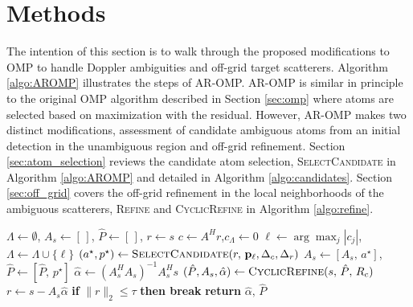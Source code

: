 
\section{Methods}
\label{sec:methods}

The intention of this section is to walk through the proposed modifications to OMP to handle Doppler ambiguities and off-grid target scatterers. Algorithm \ref{algo:AROMP} illustrates the steps of AR-OMP. AR-OMP is similar in principle to the original OMP algorithm described in Section \ref{sec:omp} where atoms are selected based on maximization with the residual. However, AR-OMP makes two distinct modifications, assessment of candidate ambiguous atoms from an initial detection in the unambiguous region and off-grid refinement. Section \ref{sec:atom_selection} reviews the candidate atom selection, \textsc{SelectCandidate} in Algorithm \ref{algo:AROMP} and detailed in Algorithm \ref{algo:candidates}. Section \ref{sec:off_grid} covers the off-grid refinement in the local neighborhoods of the ambiguous scatterers, \textsc{Refine} and \textsc{CyclicRefine} in Algorithm \ref{algo:refine}.

\begin{algorithm}[ht]
\caption{Doppler Ambiguity Refined Orthogonal Matching Pursuit (DAR-OMP)}\label{algo:AROMP}
\begin{algorithmic}[1]
\State $\Lambda \gets \emptyset$,\; $A_s \gets [\,]$,\; $\hat{P} \gets [\,]$,\; $r \gets s$
  \State $c \gets A^{H}r$,\quad $c_\Lambda \gets 0$
  \State $\ell \gets \arg\max_{j}|c_j|$,\quad $\Lambda \gets \Lambda \cup \{\ell\}$
  \State $(a^\star, p^\star) \gets \textsc{SelectCandidate}(r,\, \mathbf{p}_\ell, \Delta_{c}, \Delta_{r})$
  \State $A_s \gets [A_s,\, a^\star]$,\quad $\hat{P} \gets [\hat{P},\, p^\star]$
  \State $\hat{\alpha} \gets (A_s^{H}A_s)^{-1}A_s^{H}s$
  \State $(\hat{P}, A_s, \hat{\alpha}) \gets \textsc{CyclicRefine}(s,\, \hat{P},\, R_c)$
  \State $r \gets s - A_s\hat{\alpha}$
  \State \textbf{if} $\|r\|_2 \leq \tau$ \textbf{then break}
\EndFor
\State \textbf{return} $\hat{\alpha},\, \hat{P}$
\EndProcedure
\end{algorithmic}
\end{algorithm}

